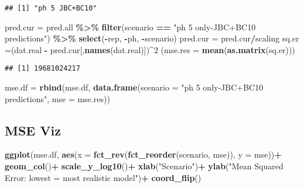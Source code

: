 \documentclass[
]{article}
\newenvironment{Shaded}{\begin{snugshade}}{\end{snugshade}}
\newcommand{\AttributeTok}[1]{\textcolor[rgb]{0.13,0.29,0.53}{#1}}
\newcommand{\DecValTok}[1]{\textcolor[rgb]{0.00,0.00,0.81}{#1}}
\newcommand{\FunctionTok}[1]{\textcolor[rgb]{0.13,0.29,0.53}{\textbf{#1}}}
\newcommand{\NormalTok}[1]{#1}
\newcommand{\OtherTok}[1]{\textcolor[rgb]{0.56,0.35,0.01}{#1}}
\newcommand{\SpecialCharTok}[1]{\textcolor[rgb]{0.81,0.36,0.00}{\textbf{#1}}}
\newcommand{\StringTok}[1]{\textcolor[rgb]{0.31,0.60,0.02}{#1}}
\begin{document}
\begin{verbatim}
## [1] "ph 5 JBC+BC10"
\end{verbatim}

\begin{Shaded}
\begin{Highlighting}[]
\NormalTok{pred.cur }\OtherTok{=}\NormalTok{ pred.all }\SpecialCharTok{\%\textgreater{}\%} 
  \FunctionTok{filter}\NormalTok{(scenario }\SpecialCharTok{==} \StringTok{"ph 5 only{-}JBC+BC10 predictions"}\NormalTok{) }\SpecialCharTok{\%\textgreater{}\%} 
  \FunctionTok{select}\NormalTok{(}\SpecialCharTok{{-}}\NormalTok{rep, }\SpecialCharTok{{-}}\NormalTok{ph, }\SpecialCharTok{{-}}\NormalTok{scenario)}
\NormalTok{pred.cur }\OtherTok{=}\NormalTok{ pred.cur}\SpecialCharTok{/}\NormalTok{scaling}
\NormalTok{sq.er }\OtherTok{=}\NormalTok{(dat.real }\SpecialCharTok{{-}}\NormalTok{ pred.cur[,}\FunctionTok{names}\NormalTok{(dat.real)])}\SpecialCharTok{\^{}}\DecValTok{2}
\NormalTok{(}\AttributeTok{mse.res =} \FunctionTok{mean}\NormalTok{(}\FunctionTok{as.matrix}\NormalTok{(sq.er)))}
\end{Highlighting}
\end{Shaded}

\begin{verbatim}
## [1] 19681024217
\end{verbatim}

\begin{Shaded}
\begin{Highlighting}[]
\NormalTok{mse.df }\OtherTok{=} \FunctionTok{rbind}\NormalTok{(mse.df, }\FunctionTok{data.frame}\NormalTok{(}\AttributeTok{scenario =} \StringTok{"ph 5 only{-}JBC+BC10 predictions"}\NormalTok{,}
                                  \AttributeTok{mse =}\NormalTok{ mse.res))}
\end{Highlighting}
\end{Shaded}

\hypertarget{mse-viz}{%
\subsection{MSE Viz}\label{mse-viz}}

\begin{Shaded}
\begin{Highlighting}[]
\FunctionTok{ggplot}\NormalTok{(mse.df, }\FunctionTok{aes}\NormalTok{(}\AttributeTok{x =} \FunctionTok{fct\_rev}\NormalTok{(}\FunctionTok{fct\_reorder}\NormalTok{(scenario, mse)), }\AttributeTok{y =}\NormalTok{ mse))}\SpecialCharTok{+}
  \FunctionTok{geom\_col}\NormalTok{()}\SpecialCharTok{+}
  \FunctionTok{scale\_y\_log10}\NormalTok{()}\SpecialCharTok{+}
  \FunctionTok{xlab}\NormalTok{(}\StringTok{"Scenario"}\NormalTok{)}\SpecialCharTok{+}
  \FunctionTok{ylab}\NormalTok{(}\StringTok{"Mean Squared Error: lowest = most realistic model"}\NormalTok{)}\SpecialCharTok{+}
  \FunctionTok{coord\_flip}\NormalTok{()}
\end{Highlighting}
\end{Shaded}
\end{document}
